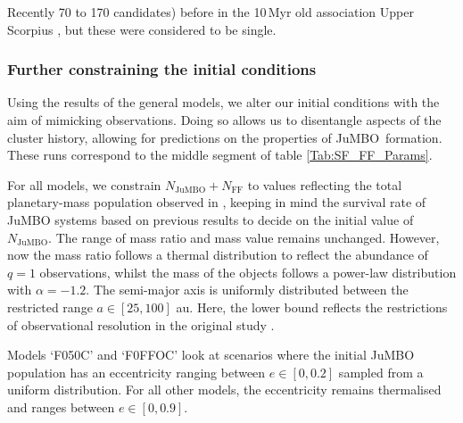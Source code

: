 \documentclass[aa]{lib/aa}
\newcommand{\jumbo}{\mbox{JuMBO}}
\begin{document}
Recently 
70 to 170 candidates) before in the 10\,Myr old association
Upper Scorpius \citep{2022NatAs...6...89M}, but these were considered
to be single. 

\subsubsection{Further constraining the initial conditions}
Using the results of the general models, we alter our initial
conditions with the aim of mimicking observations. Doing so allows us
to disentangle aspects of the cluster history, allowing for
predictions on the properties of \jumbo\, formation. These runs
correspond to the middle segment of table \ref{Tab:SF_FF_Params}.
    
For all models, we constrain $N_{\mathrm{JuMBO}} + N_{\mathrm{FF}}$ to
values reflecting the total planetary-mass population observed in
\citet{2023arXiv231001231P}, keeping in mind the survival rate of
JuMBO systems based on previous results to decide on the initial value
of $N_{\mathrm{JuMBO}}$. The range of mass ratio and mass value
remains unchanged. However, now the mass ratio follows a thermal
distribution to reflect the abundance of $q=1$ observations, whilst
the mass of the objects follows a power-law distribution with $\alpha
= -1.2$. The semi-major axis is uniformly distributed between the
restricted range $a\in[25,100]$ au. Here, the lower bound reflects the
restrictions of observational resolution in the original study
\citep{2023arXiv231001231P}.
    
Models `F050C' and `F0FFOC' look at scenarios where the initial JuMBO
population has an eccentricity ranging between $e\in[0,0.2]$ sampled
from a uniform distribution. For all other models, the eccentricity
remains thermalised and ranges between $e\in[0,0.9]$.
 
\end{document}
